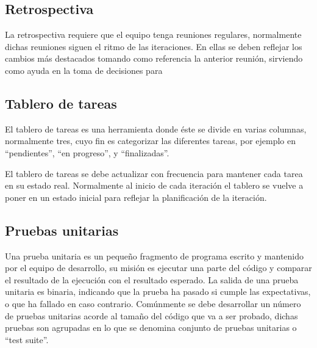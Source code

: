 \subsection{Retrospectiva}

La retrospectiva requiere que el equipo tenga reuniones regulares, normalmente dichas reuniones siguen el ritmo de las iteraciones. En ellas se deben reflejar los cambios más destacados tomando como referencia la anterior reunión, sirviendo como ayuda en la toma de decisiones para 

\subsection{Tablero de tareas}

El tablero de tareas es una herramienta donde éste se divide en varias columnas, normalmente tres, cuyo fin es categorizar las diferentes tareas, por ejemplo en ``pendientes'', ``en progreso'', y ``finalizadas''.

El tablero de tareas se debe actualizar con frecuencia para mantener cada tarea en su estado real. Normalmente al inicio de cada iteración el tablero se vuelve a poner en un estado inicial para reflejar la planificación de la iteración.

\subsection{Pruebas unitarias}

Una prueba unitaria es un pequeño fragmento de programa escrito y mantenido por el equipo de desarrollo, su misión es ejecutar una parte del código y comparar el resultado de la ejecución con el resultado esperado. La salida de una prueba unitaria es binaria, indicando que la prueba ha pasado si cumple las expectativas, o que ha fallado en caso contrario. Comúnmente se debe desarrollar un número de pruebas unitarias acorde al tamaño del código que va a ser probado, dichas pruebas son agrupadas en lo que se denomina conjunto de pruebas unitarias o ``test suite''.

